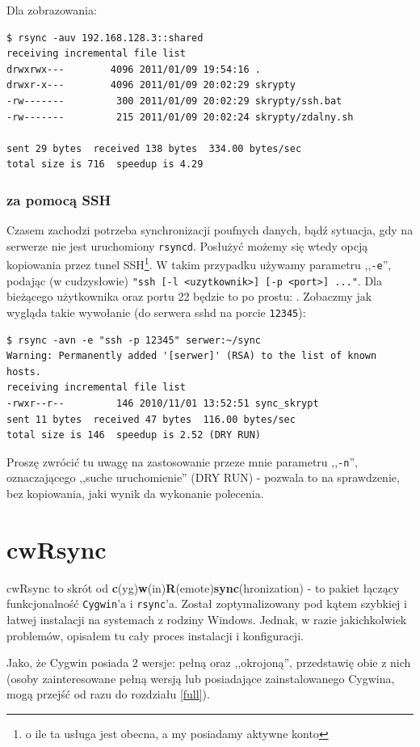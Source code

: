 Dla zobrazowania:
\begin{verbatim}
$ rsync -auv 192.168.128.3::shared
receiving incremental file list
drwxrwx---        4096 2011/01/09 19:54:16 .
drwxr-x---        4096 2011/01/09 20:02:29 skrypty
-rw-------         300 2011/01/09 20:02:29 skrypty/ssh.bat
-rw-------         215 2011/01/09 20:02:24 skrypty/zdalny.sh

sent 29 bytes  received 138 bytes  334.00 bytes/sec
total size is 716  speedup is 4.29
\end{verbatim}

\subsubsection{za pomocą SSH}
Czasem zachodzi potrzeba synchronizacji poufnych danych, bądź sytuacja, gdy na serwerze nie jest uruchomiony \verb|rsyncd|. Posłużyć możemy się wtedy opcją kopiowania przez tunel SSH\footnote{o ile ta usługa jest obecna, a my posiadamy aktywne konto}. W takim przypadku używamy parametru ,,\verb|-e|'', podając (w cudzysłowie) \verb|"ssh [-l <uzytkownik>] [-p <port>] ..."|. Dla bieżącego użytkownika oraz portu 22 będzie to po prostu: . Zobaczmy jak wygląda takie wywołanie (do serwera sshd na porcie \verb|12345|):
\begin{verbatim}
$ rsync -avn -e "ssh -p 12345" serwer:~/sync 
Warning: Permanently added '[serwer]' (RSA) to the list of known hosts.
receiving incremental file list
-rwxr--r--         146 2010/11/01 13:52:51 sync_skrypt
sent 11 bytes  received 47 bytes  116.00 bytes/sec
total size is 146  speedup is 2.52 (DRY RUN)
\end{verbatim}
Proszę zwrócić tu uwagę na zastosowanie przeze mnie parametru ,,\verb|-n|'', oznaczającego ,,suche uruchomienie'' (DRY RUN) - pozwala to na sprawdzenie, bez kopiowania, jaki wynik da wykonanie polecenia.


\section{cwRsync}
\label{cwrsync}
cwRsync to skrót od {\bf c}(yg){\bf w}(in){\bf R}(emote){\bf sync}(hronization) - to pakiet łączący funkcjonalność \verb|Cygwin|'a \cite{7} i \verb|rsync|'a. Został zoptymalizowany pod kątem szybkiej i łatwej instalacji na systemach z rodziny Windows. Jednak, w razie jakichkolwiek problemów, opisałem tu cały proces instalacji i konfiguracji.

Jako, że Cygwin posiada 2 wersje: pełną oraz ,,okrojoną'', przedstawię obie z nich (osoby zainteresowane pełną wersją lub posiadające zainstalowanego Cygwina, mogą przejść od razu do rozdziału \ref{full}).

